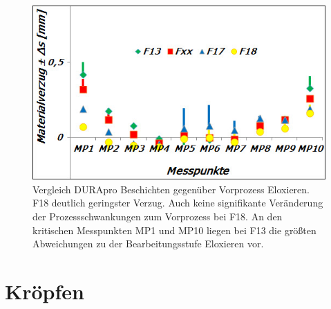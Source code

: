 \documentclass[12pt,a4paper,parskip,twoside,BCOR5mm,headsepline]{scrartcl}
\begin{document}
\begin{description*}
\begin{table}
\begin{tabular}{cccccccccccc}
\end{tabular}
\end{table}
\newpage

\begin{figure}[hbtp]
\centering
\includegraphics[width=.8\textwidth]{verzugdurapro}
\caption{Vergleich DURApro Beschichten gegenüber Vorprozess Eloxieren. F18 deutlich geringster Verzug. Auch keine signifikante Veränderung der Prozessschwankungen zum Vorprozess bei F18. An den kritischen Messpunkten MP1 und MP10 liegen bei F13 die größten Abweichungen zu der Bearbeitungsstufe Eloxieren vor. }
\label{fig:verzugdurapro}
\end{figure}















\section{Kröpfen \label{sec:kropf}}


\end{description*}
\end{document}
